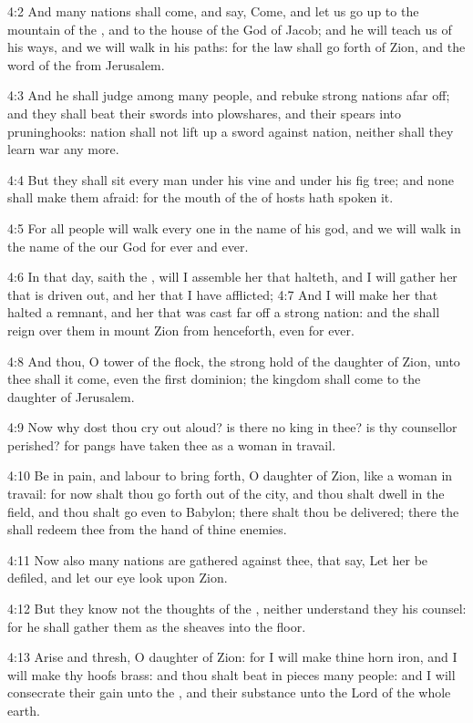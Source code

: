 4:2 And many nations shall come, and say, Come, and let us go up to
the mountain of the \LORD, and to the house of the God of Jacob; and he
will teach us of his ways, and we will walk in his paths: for the law
shall go forth of Zion, and the word of the \LORD from Jerusalem.

4:3 And he shall judge among many people, and rebuke strong nations
afar off; and they shall beat their swords into plowshares, and their
spears into pruninghooks: nation shall not lift up a sword against
nation, neither shall they learn war any more.

4:4 But they shall sit every man under his vine and under his fig
tree; and none shall make them afraid: for the mouth of the \LORD of
hosts hath spoken it.

4:5 For all people will walk every one in the name of his god, and we
will walk in the name of the \LORD our God for ever and ever.

4:6 In that day, saith the \LORD, will I assemble her that halteth, and
I will gather her that is driven out, and her that I have afflicted;
4:7 And I will make her that halted a remnant, and her that was cast
far off a strong nation: and the \LORD shall reign over them in mount
Zion from henceforth, even for ever.

4:8 And thou, O tower of the flock, the strong hold of the daughter of
Zion, unto thee shall it come, even the first dominion; the kingdom
shall come to the daughter of Jerusalem.

4:9 Now why dost thou cry out aloud? is there no king in thee? is thy
counsellor perished? for pangs have taken thee as a woman in travail.

4:10 Be in pain, and labour to bring forth, O daughter of Zion, like a
woman in travail: for now shalt thou go forth out of the city, and
thou shalt dwell in the field, and thou shalt go even to Babylon;
there shalt thou be delivered; there the \LORD shall redeem thee from
the hand of thine enemies.

4:11 Now also many nations are gathered against thee, that say, Let
her be defiled, and let our eye look upon Zion.

4:12 But they know not the thoughts of the \LORD, neither understand
they his counsel: for he shall gather them as the sheaves into the
floor.

4:13 Arise and thresh, O daughter of Zion: for I will make thine horn
iron, and I will make thy hoofs brass: and thou shalt beat in pieces
many people: and I will consecrate their gain unto the \LORD, and their
substance unto the Lord of the whole earth.


